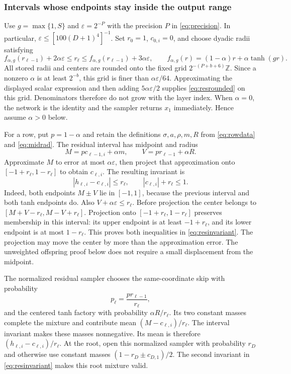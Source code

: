 \subsubsection{Intervals whose endpoints stay inside the output range}

Use $g=\max\{1,S\}$ and
$\varepsilon=2^{-P}$ with the precision $P$ in
\eqref{eq:precision}. In particular,
$\varepsilon\le[100(D+1)^4]^{-1}$.
Set $r_0=1$, $c_{0,i}=0$, and choose dyadic radii satisfying
\begin{equation}\label{eq:resrounded}
f_{\alpha,g}(r_{\ell-1})+2\alpha\varepsilon
\le r_\ell\le
f_{\alpha,g}(r_{\ell-1})+3\alpha\varepsilon,
\qquad
f_{\alpha,g}(r)=(1-\alpha)r+\alpha\tanh(gr).
\end{equation}
All stored radii and centers are rounded onto the fixed grid
$2^{-(P+b+6)}\mathbb Z$. Since a nonzero $\alpha$ is at least
$2^{-b}$, this grid is finer than $\alpha\varepsilon/64$.
Approximating the displayed scalar expression and then adding
$5\alpha\varepsilon/2$ supplies \eqref{eq:resrounded} on this
grid. Denominators therefore do not grow with the layer index.
When $\alpha=0$, the network is the identity and the sampler returns
$x_1$ immediately. Hence assume $\alpha>0$ below.

For a row, put $p=1-\alpha$ and retain the definitions
$\sigma,a,\rho,m,R$ from \eqref{eq:rowdata} and
\eqref{eq:midrad}. The residual interval has midpoint and radius
\[
M=p c_{\ell-1,i}+\alpha m,
\qquad
V=p r_{\ell-1}+\alpha R.
\]
Approximate $M$ to error at most $\alpha\varepsilon$, then project
that approximation onto $[-1+r_\ell,1-r_\ell]$ to obtain
$c_{\ell,i}$. The resulting invariant is
\begin{equation}\label{eq:resinvariant}
|h_{\ell,i}-c_{\ell,i}|\le r_\ell,
\qquad |c_{\ell,i}|+r_\ell\le1.
\end{equation}
Indeed, both endpoints $M\pm V$ lie in $[-1,1]$, because the
previous interval and both tanh endpoints do. Also
$V+\alpha\varepsilon\le r_\ell$.
Before projection the center belongs to $[M+V-r_\ell,M-V+r_\ell]$.
Projection onto $[-1+r_\ell,1-r_\ell]$ preserves membership in this
interval: its upper endpoint is at least $-1+r_\ell$, and its lower
endpoint is at most $1-r_\ell$.
This proves both inequalities in \eqref{eq:resinvariant}.
The projection may move the center by more than the approximation
error. The unweighted offspring proof below does not require a
small displacement from the midpoint.

The normalized residual sampler chooses the same-coordinate skip
with probability
\begin{equation}\label{eq:resskip}
p_\ell=\frac{p r_{\ell-1}}{r_\ell},
\end{equation}
and the centered tanh factory with probability
$\alpha R/r_\ell$. Its two constant masses complete the mixture
and contribute mean $(M-c_{\ell,i})/r_\ell$.
The interval invariant makes these masses nonnegative.
Its mean is therefore $(h_{\ell,i}-c_{\ell,i})/r_\ell$.
At the root, open this normalized sampler with probability $r_D$
and otherwise use constant masses $(1-r_D\pm c_{D,1})/2$.
The second invariant in \eqref{eq:resinvariant} makes this root
mixture valid.

